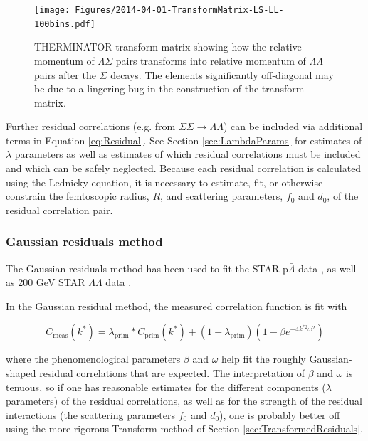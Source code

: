 \begin{figure}[hbtp]
\texttt{[image: Figures/2014-04-01-TransformMatrix-LS-LL-100bins.pdf]}
\caption[Transform matrix for $k^*_{\Lambda\Sigma} \rightarrow k^*_{\Lambda\Lambda}$]{THERMINATOR \cite{Chojnacki:2011hb} transform matrix showing how the relative momentum of $\Lambda\Sigma$ pairs transforms into relative momentum of $\Lambda\Lambda$ pairs after the $\Sigma$ decays.  
The elements significantly off-diagonal may be due to a lingering bug in the construction of the transform matrix.}
\label{fig:TherminatorLS}
\end{figure}

Further residual correlations (e.g. from $\Sigma\Sigma \rightarrow \Lambda\Lambda$) can be included via additional terms in Equation \ref{eq:Residual}.  
See Section \ref{sec:LambdaParams} for estimates of $\lambda$ parameters as well as estimates of which residual correlations must be included and which can be safely neglected.  
Because each residual correlation is calculated using the Lednicky equation, it is necessary to estimate, fit, or otherwise constrain the femtoscopic radius, $R$, and scattering parameters, $f_0$ and $d_0$, of the residual correlation pair.

\subsubsection{Gaussian residuals method}
\label{sec:GaussianResiduals}

The Gaussian residuals method has been used  to fit the STAR p$\bar{\Lambda}$ data \cite{Shapoval:2014yha}, as well as 200 GeV STAR $\Lambda\Lambda$ data \cite{Adamczyk:2014vca}.

In the Gaussian residual method, the measured correlation function is fit with 

\begin{equation}
\label{eq:GaussianResiduals}
C_{\mathrm{meas}}(k^*) = \lambda_{\mathrm{prim}}*C_{\mathrm{prim}}(k^*)+(1-\lambda_{\mathrm{prim}})(1-\beta  e^{-4k^{*2}\omega^2})
\end{equation}

where the phenomenological parameters $\beta$ and $\omega$ help fit the roughly Gaussian-shaped residual correlations that are expected.
The interpretation of $\beta$ and $\omega$ is tenuous, so if one has reasonable estimates for the different components ($\lambda$ parameters) of the residual correlations, as well as for the strength of the residual interactions (the scattering parameters $f_0$ and $d_0$), one is probably better off using the more rigorous Transform method of Section \ref{sec:TransformedResiduals}.

